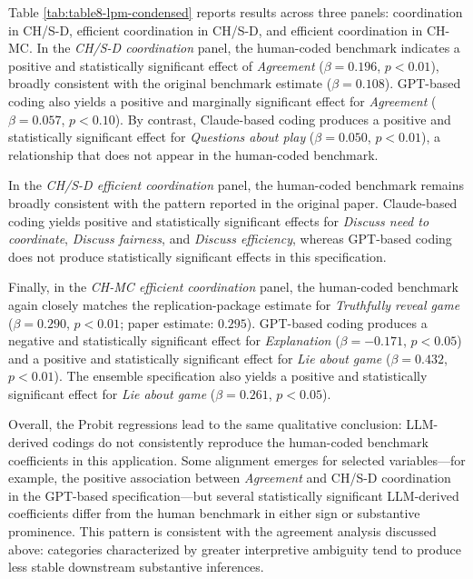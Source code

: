 \documentclass[11pt]{article}
\begin{document}
\begin{sloppypar}
Table \ref{tab:table8-lpm-condensed} reports results across three panels: coordination in CH/S-D, efficient coordination in CH/S-D, and efficient coordination in CH-MC. In the \textit{CH/S-D coordination} panel, the human-coded benchmark indicates a positive and statistically significant effect of \textit{Agreement} ($\beta = 0.196$, $p < 0.01$), broadly consistent with the original benchmark estimate ($\beta = 0.108$). GPT-based coding also yields a positive and marginally significant effect for \textit{Agreement} ($\beta = 0.057$, $p < 0.10$). By contrast, Claude-based coding produces a positive and statistically significant effect for \textit{Questions about play} ($\beta = 0.050$, $p < 0.01$), a relationship that does not appear in the human-coded benchmark.

In the \textit{CH/S-D efficient coordination} panel, the human-coded benchmark remains broadly consistent with the pattern reported in the original paper. Claude-based coding yields positive and statistically significant effects for \textit{Discuss need to coordinate}, \textit{Discuss fairness}, and \textit{Discuss efficiency}, whereas GPT-based coding does not produce statistically significant effects in this specification.

Finally, in the \textit{CH-MC efficient coordination} panel, the human-coded benchmark again closely matches the replication-package estimate for \textit{Truthfully reveal game} ($\beta = 0.290$, $p < 0.01$; paper estimate: $0.295$). GPT-based coding produces a negative and statistically significant effect for \textit{Explanation} ($\beta = -0.171$, $p < 0.05$) and a positive and statistically significant effect for \textit{Lie about game} ($\beta = 0.432$, $p < 0.01$). The ensemble specification also yields a positive and statistically significant effect for \textit{Lie about game} ($\beta = 0.261$, $p < 0.05$).

Overall, the Probit regressions lead to the same qualitative conclusion: LLM-derived codings do not consistently reproduce the human-coded benchmark coefficients in this application. Some alignment emerges for selected variables—for example, the positive association between \textit{Agreement} and CH/S-D coordination in the GPT-based specification—but several statistically significant LLM-derived coefficients differ from the human benchmark in either sign or substantive prominence. This pattern is consistent with the agreement analysis discussed above: categories characterized by greater interpretive ambiguity tend to produce less stable downstream substantive inferences.



\end{sloppypar}
\end{document}
